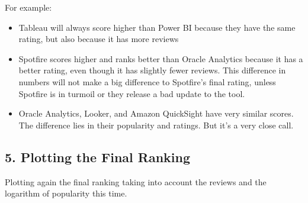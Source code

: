 \documentclass[
]{article}
\newenvironment{Shaded}{\begin{snugshade}}{\end{snugshade}}
\newcommand{\AttributeTok}[1]{\textcolor[rgb]{0.13,0.29,0.53}{#1}}
\newcommand{\ConstantTok}[1]{\textcolor[rgb]{0.56,0.35,0.01}{#1}}
\newcommand{\DecValTok}[1]{\textcolor[rgb]{0.00,0.00,0.81}{#1}}
\newcommand{\FunctionTok}[1]{\textcolor[rgb]{0.13,0.29,0.53}{\textbf{#1}}}
\newcommand{\NormalTok}[1]{#1}
\newcommand{\OtherTok}[1]{\textcolor[rgb]{0.56,0.35,0.01}{#1}}
\newcommand{\SpecialCharTok}[1]{\textcolor[rgb]{0.81,0.36,0.00}{\textbf{#1}}}
\newcommand{\StringTok}[1]{\textcolor[rgb]{0.31,0.60,0.02}{#1}}
\providecommand{\tightlist}{%
  \setlength{\itemsep}{0pt}\setlength{\parskip}{0pt}}
\begin{document}
For example:

\begin{itemize}
\tightlist
\item
  Tableau will always score higher than Power BI because they have the
  same rating, but also because it has more reviews
\item
  Spotfire scores higher and ranks better than Oracle Analytics because
  it has a better rating, even though it has slightly fewer reviews.
  This difference in numbers will not make a big difference to
  Spotfire's final rating, unless Spotfire is in turmoil or they release
  a bad update to the tool.
\item
  Oracle Analytics, Looker, and Amazon QuickSight have very similar
  scores. The difference lies in their popularity and ratings. But it's
  a very close call.
\end{itemize}

\subsection{5. Plotting the Final
Ranking}\label{plotting-the-final-ranking}

Plotting again the final ranking taking into account the reviews and the
logarithm of popularity this time.

\begin{Shaded}
\end{Shaded}
\end{document}
